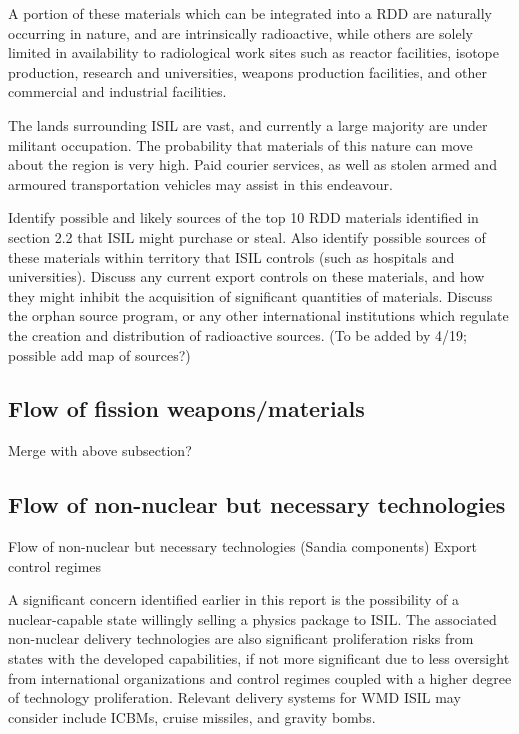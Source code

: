 \documentclass{report}
\begin{document}
A portion of these materials which can be integrated into a RDD are naturally occurring in nature, and are intrinsically radioactive, while others are solely limited in availability to radiological work sites such as reactor facilities, isotope production, research and universities, weapons production facilities, and other commercial and industrial facilities. 

The lands surrounding ISIL are vast, and currently a large majority are under militant occupation.  The probability that materials of this nature can move about the region is very high.  Paid courier services, as well as stolen armed and armoured transportation vehicles  may assist in this endeavour.

Identify possible and likely sources of the top 10 RDD materials identified in section 2.2 that ISIL might purchase or steal. Also identify possible sources of these materials within territory that ISIL controls (such as hospitals and universities). Discuss any current export controls on these materials, and how they might inhibit the acquisition of significant quantities of materials. Discuss the orphan source program, or any other international institutions which regulate the creation and distribution of radioactive sources. (To be added by 4/19; possible add map of sources?)


\subsection{Flow of fission weapons/materials}

Merge with above subsection?


\subsection{Flow of non-nuclear but necessary technologies}

Flow of non-nuclear but necessary technologies (Sandia components)
Export control regimes

A significant concern identified earlier in this report is the possibility of a nuclear-capable state willingly selling a physics package to ISIL. The associated non-nuclear delivery technologies are also significant proliferation risks from states with the developed capabilities, if not more significant due to less oversight from international organizations and control regimes coupled with a higher degree of technology proliferation. Relevant delivery systems for WMD ISIL may consider include ICBMs, cruise missiles, and gravity bombs. 
\end{document}

